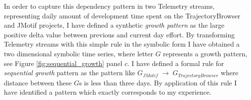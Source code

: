 In order to capture this dependency pattern in two Telemetry streams, representing daily amount of development time spent on the TrajectoryBrowser and JMotif projects, I have defined a synthetic \textit{growth pattern} as the large positive delta value between previous and current day effort. By transforming Telemetry streams with this simple rule in the symbolic form I have obtained a two dimensional symbolic time series, where letter $G$ represents a growth pattern, see Figure \ref{fig:sequential_growth} panel $c$. I have defined a formal rule for \textit{sequential growth} pattern as the pattern like $G_{JMotif}\; \rightarrow \; G_{TrajectoryBrowser}$ where distance between these $G$s is less than three days. By application of this rule I have identified a pattern which exactly corresponds to my experience.
